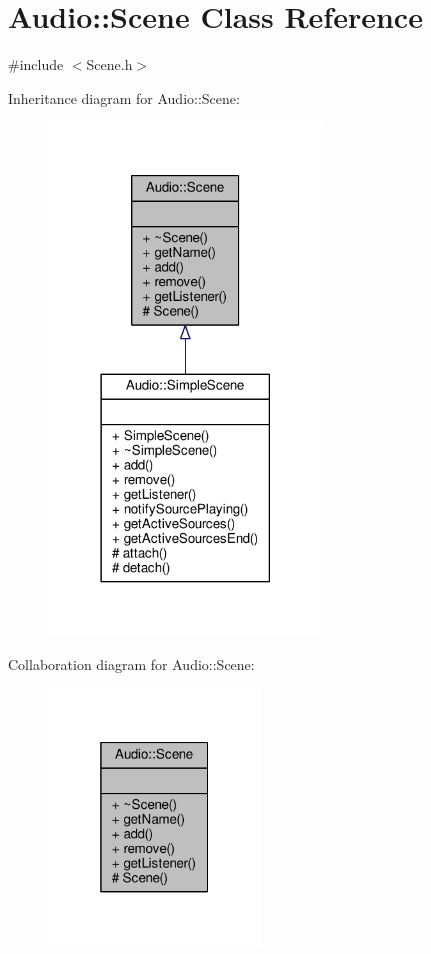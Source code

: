 \hypertarget{classAudio_1_1Scene}{}\section{Audio\+:\+:Scene Class Reference}
\label{classAudio_1_1Scene}


{\ttfamily \#include $<$Scene.\+h$>$}



Inheritance diagram for Audio\+:\+:Scene\+:
\nopagebreak
\begin{figure}[H]
\begin{center}
\leavevmode
\includegraphics[width=206pt]{d0/d53/classAudio_1_1Scene__inherit__graph}
\end{center}
\end{figure}


Collaboration diagram for Audio\+:\+:Scene\+:
\nopagebreak
\begin{figure}[H]
\begin{center}
\leavevmode
\includegraphics[width=160pt]{dd/d1c/classAudio_1_1Scene__coll__graph}
\end{center}
\end{figure}
